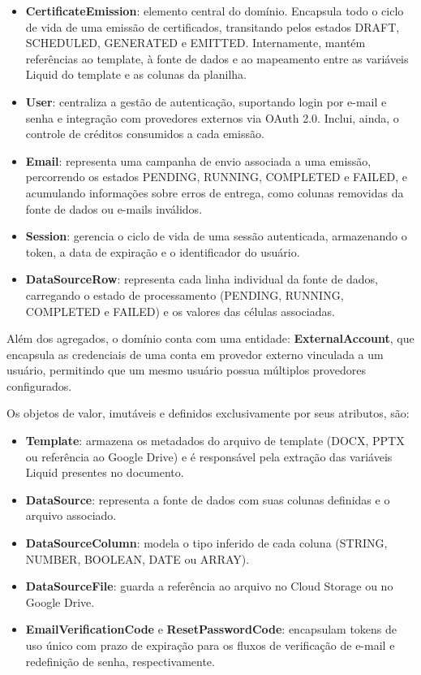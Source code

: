\documentclass[article,a4paper,12pt,brazil,sumario=tradicional]{abntex2}
\begin{document}
\begin{itemize}
    \item \textbf{CertificateEmission}: elemento central do domínio. Encapsula todo o ciclo de vida de uma emissão de certificados, transitando pelos estados DRAFT, SCHEDULED, GENERATED e EMITTED. Internamente, mantém referências ao template, à fonte de dados e ao mapeamento entre as variáveis Liquid do template e as colunas da planilha.
    
    \item \textbf{User}: centraliza a gestão de autenticação, suportando login por e-mail e senha e integração com provedores externos via OAuth 2.0. Inclui, ainda, o controle de créditos consumidos a cada emissão.
    
    \item \textbf{Email}: representa uma campanha de envio associada a uma emissão, percorrendo os estados PENDING, RUNNING, COMPLETED e FAILED, e acumulando informações sobre erros de entrega, como colunas removidas da fonte de dados ou e-mails inválidos.
    
    \item \textbf{Session}: gerencia o ciclo de vida de uma sessão autenticada, armazenando o token, a data de expiração e o identificador do usuário.
    
    \item \textbf{DataSourceRow}: representa cada linha individual da fonte de dados, carregando o estado de processamento (PENDING, RUNNING, COMPLETED e FAILED) e os valores das células associadas.
\end{itemize}

Além dos agregados, o domínio conta com uma entidade: \textbf{ExternalAccount}, que encapsula as credenciais de uma conta em provedor externo vinculada a um usuário, permitindo que um mesmo usuário possua múltiplos provedores configurados.

Os objetos de valor, imutáveis e definidos exclusivamente por seus atributos, são:

\begin{itemize}
    \item \textbf{Template}: armazena os metadados do arquivo de template (DOCX, PPTX ou referência ao Google Drive) e é responsável pela extração das variáveis Liquid presentes no documento.
    
    \item \textbf{DataSource}: representa a fonte de dados com suas colunas definidas e o arquivo associado.
    
    \item \textbf{DataSourceColumn}: modela o tipo inferido de cada coluna (STRING, NUMBER, BOOLEAN, DATE ou ARRAY).
    
    \item \textbf{DataSourceFile}: guarda a referência ao arquivo no Cloud Storage ou no Google Drive.
    
    \item \textbf{EmailVerificationCode} e \textbf{ResetPasswordCode}: encapsulam tokens de uso único com prazo de expiração para os fluxos de verificação de e-mail e redefinição de senha, respectivamente.
\end{itemize}
\end{document}

